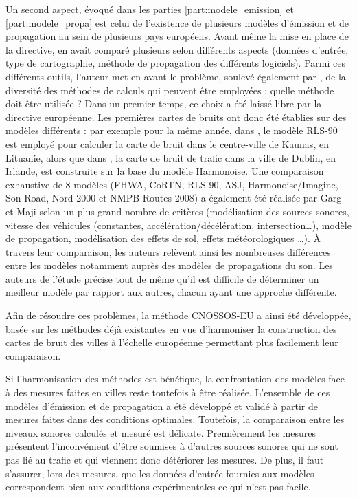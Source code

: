 Un second aspect, évoqué dans les parties \ref{part:modele_emission} et \ref{part:modele_propa} est celui de l'existence de plusieurs modèles d'émission et de propagation au sein de plusieurs pays européens. Avant même la mise en place de la directive, \cite{steele_critical_2001} en avait comparé plusieurs selon différents aspects (données d'entrée, type de cartographie, méthode de propagation des différents logiciels). 
Parmi ces différents outils, l'auteur met en avant le problème, soulevé également par \cite{king_implementation_2011}, de la diversité des méthodes de calculs qui peuvent être employées : quelle méthode doit-être utilisée ? 
Dans un premier temps, ce choix a été laissé libre par la directive européenne. Les premières cartes de bruits ont donc été établies sur des modèles différents : par exemple pour la même année, dans \cite{kliuvcininkas2006noise}, le modèle RLS-90 est employé pour calculer la carte de bruit dans le centre-ville de Kaunas, en Lituanie,  alors que dans \cite{murphy_environmental_2006}, la carte de bruit de trafic dans la ville de Dublin, en Irlande, est construite sur la base du modèle Harmonoise. 
Une comparaison exhaustive de 8 modèles (FHWA, CoRTN, RLS-90, ASJ, Harmonoise/Imagine, Son Road, Nord 2000 et NMPB-Routes-2008) a également été réalisée par Garg et Maji \cite{garg_critical_2014} selon un plus grand nombre de critères (modélisation des sources sonores, vitesse des véhicules (constantes, accélération/décélération, intersection\dots), modèle de propagation, modélisation des effets de sol, effets météorologiques \dots). À travers leur comparaison, les auteurs relèvent ainsi les nombreuses différences entre les modèles notamment auprès des modèles de propagations du son. Les auteurs de l'étude précise tout de même qu'il est difficile de déterminer un \og meilleur \fg{} modèle par rapport aux autres, chacun ayant une approche différente. 

Afin de résoudre ces problèmes, la méthode CNOSSOS-EU \cite{CNOSSOS,kephalopoulos} a ainsi été développée, basée sur les méthodes déjà existantes en vue d'harmoniser la construction des cartes de bruit des villes à l'échelle européenne permettant plus facilement leur comparaison. 

Si l'harmonisation des méthodes est bénéfique, la confrontation des modèles face à des mesures faites en villes reste toutefois à être réalisée. L'ensemble de ces modèles d'émission et de propagation a été développé et validé à partir de mesures faites dans des conditions optimales. Toutefois, la comparaison entre les niveaux sonores calculés et mesuré est délicate. Premièrement les mesures présentent l'inconvénient d'être soumises à d'autres sources sonores qui ne sont pas lié au trafic et qui viennent donc détériorer les mesures. De plus, il faut s'assurer, lors des mesures, que les données d'entrée fournies aux modèles correspondent bien aux conditions expérimentales ce qui n'est pas facile.

